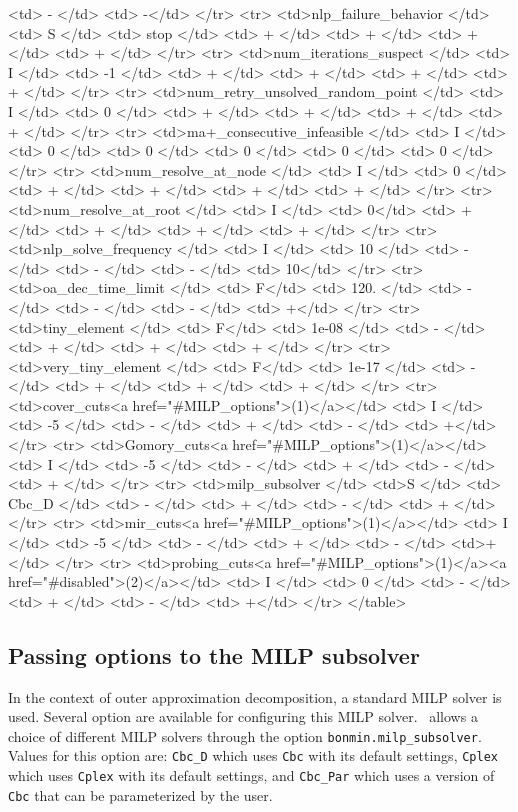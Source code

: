 {\begin{rawhtml}
    <td> - </td>
    <td> -</td>
  </tr>
  <tr>
    <td>nlp_failure_behavior </td>
    <td> S </td>
    <td> stop </td>
    <td> + </td>
    <td> + </td>
    <td> + </td>
    <td> + </td>
  </tr>
  <tr>
    <td>num_iterations_suspect </td>
    <td> I </td>
    <td> -1 </td>
    <td> + </td>
    <td> + </td>
    <td> + </td>
    <td> + </td>
  </tr>
  <tr>
    <td>num_retry_unsolved_random_point </td>
    <td> I </td>
    <td> 0 </td>
    <td> + </td>
    <td> + </td>
    <td> + </td>
    <td> + </td>
  </tr>
  <tr>
    <td>ma+_consecutive_infeasible </td>
    <td> I </td>
    <td> 0 </td>
    <td> 0 </td>
    <td> 0 </td>
    <td> 0 </td>
    <td> 0 </td>
  </tr>
  <tr>
    <td>num_resolve_at_node </td>
    <td> I </td>
    <td> 0 </td>
    <td> + </td>
    <td> + </td>
    <td> + </td>
    <td> + </td>
  </tr>
  <tr>
    <td>num_resolve_at_root </td>
    <td> I </td>
    <td> 0</td>
    <td> + </td>
    <td> + </td>
    <td> + </td>
    <td> + </td>
  </tr>
  <tr>
    <td>nlp_solve_frequency </td>
    <td> I </td>
    <td> 10 </td>
    <td> - </td>
    <td> - </td>
    <td> - </td>
    <td> 10</td>
  </tr>
  <tr>
    <td>oa_dec_time_limit </td>
    <td> F</td>
    <td> 120. </td>
    <td> - </td>
    <td> - </td>
    <td> - </td>
    <td> +</td>
  </tr>
  <tr>
    <td>tiny_element </td>
    <td> F</td>
    <td> 1e-08 </td>
    <td> - </td>
    <td> + </td>
    <td> + </td>
    <td> + </td>
  </tr>
  <tr>
    <td>very_tiny_element </td>
    <td> F</td>
    <td> 1e-17 </td>
    <td> - </td>
    <td> + </td>
    <td> + </td>
    <td> + </td>
  </tr>
    <tr>
    <td>cover_cuts<a href="#MILP_options">(1)</a></td>
    <td> I </td>
    <td> -5 </td>
    <td> - </td>
    <td> + </td>
    <td> - </td>
    <td> +</td>
  </tr>
  <tr>
    <td>Gomory_cuts<a href="#MILP_options">(1)</a></td>
    <td> I </td>
    <td> -5 </td>
    <td> - </td>
    <td> + </td>
    <td> - </td>
    <td> + </td>
  </tr>
  <tr>
    <td>milp_subsolver </td>
    <td>S </td>
    <td> Cbc_D </td>
    <td> - </td>
    <td> + </td>
    <td> - </td>
    <td> + </td>
  </tr>
  <tr>
    <td>mir_cuts<a href="#MILP_options">(1)</a></td>
    <td> I </td>
    <td> -5 </td>
    <td> - </td>
    <td> + </td>
    <td> - </td>
    <td>+</td>
  </tr>
  <tr>
    <td>probing_cuts<a href="#MILP_options">(1)</a><a href="#disabled">(2)</a></td>
    <td> I </td>
    <td> 0 </td>
    <td> - </td>
    <td> + </td>
    <td> - </td>
    <td> +</td>
  </tr>
</table>
\end{rawhtml}
}


\subsection{Passing options to the MILP subsolver}
\label{sec:milp_opt}
In the context of outer approximation decomposition, a standard MILP solver is used.
Several option are available for configuring this MILP solver.
\Bonmin\ allows a choice of different MILP solvers through the option
{\tt bonmin.milp\_subsolver}. Values for this option are: {\tt Cbc\_D} which uses {\tt Cbc} with its
default settings, {\tt Cplex} which uses {\tt Cplex} with its default settings, and
{\tt Cbc\_Par} which uses a version of {\tt Cbc} that can be parameterized by the user.


